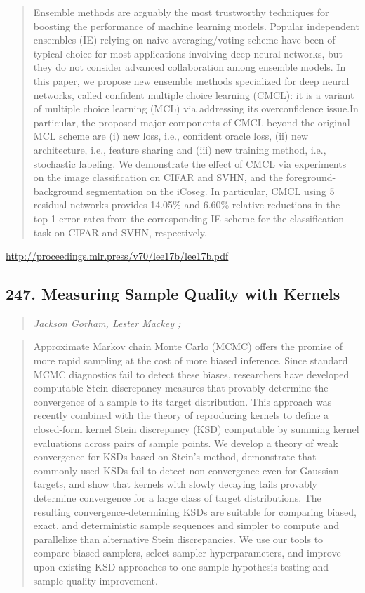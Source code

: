 \documentclass{article}
\begin{document}
\begin{quote}
    Ensemble methods are arguably the most trustworthy techniques for boosting the performance of machine learning models. Popular independent ensembles (IE) relying on naive averaging/voting scheme have been of typical choice for most applications involving deep neural networks, but they do not consider advanced collaboration among ensemble models. In this paper, we propose new ensemble methods specialized for deep neural networks, called confident multiple choice learning (CMCL): it is a variant of multiple choice learning (MCL) via addressing its overconfidence issue.In particular, the proposed major components of CMCL beyond the original MCL scheme are (i) new loss, i.e., confident oracle loss, (ii) new architecture, i.e., feature sharing and (iii) new training method, i.e., stochastic labeling. We demonstrate the effect of CMCL via experiments on the image classification on CIFAR and SVHN, and the foreground-background segmentation on the iCoseg. In particular, CMCL using 5 residual networks provides 14.05\% and 6.60\% relative reductions in the top-1 error rates from the corresponding IE scheme for the classification task on CIFAR and SVHN, respectively.  \end{quote}

\href{http://proceedings.mlr.press/v70/lee17b/lee17b.pdf}{http://proceedings.mlr.press/v70/lee17b/lee17b.pdf}

\subsection{247. Measuring Sample Quality with Kernels}

\begin{quote}
\footnotesize{\textit{Jackson Gorham, Lester Mackey ;}}
\end{quote}

\begin{quote}
    Approximate Markov chain Monte Carlo (MCMC) offers the promise of more rapid sampling at the cost of more biased inference. Since standard MCMC diagnostics fail to detect these biases, researchers have developed computable Stein discrepancy measures that provably determine the convergence of a sample to its target distribution. This approach was recently combined with the theory of reproducing kernels to define a closed-form kernel Stein discrepancy (KSD) computable by summing kernel evaluations across pairs of sample points. We develop a theory of weak convergence for KSDs based on Stein’s method, demonstrate that commonly used KSDs fail to detect non-convergence even for Gaussian targets, and show that kernels with slowly decaying tails provably determine convergence for a large class of target distributions. The resulting convergence-determining KSDs are suitable for comparing biased, exact, and deterministic sample sequences and simpler to compute and parallelize than alternative Stein discrepancies. We use our tools to compare biased samplers, select sampler hyperparameters, and improve upon existing KSD approaches to one-sample hypothesis testing and sample quality improvement.  \end{quote}
\end{document}
